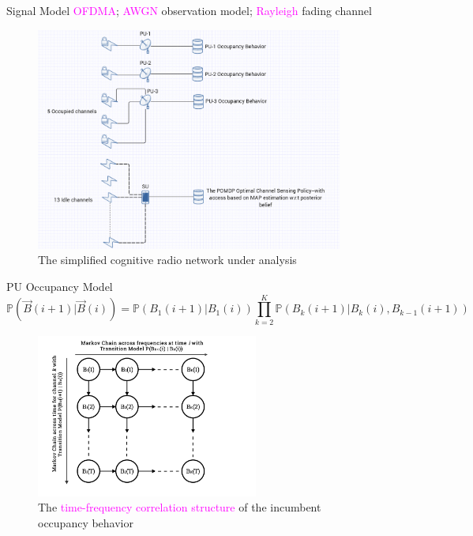 \documentclass{beamer}
\begin{document}
\begin{frame}{Signal Model}
\footnotesize{\textcolor{magenta}{OFDMA}; \textcolor{magenta}{AWGN} observation model; \textcolor{magenta}{Rayleigh} fading channel}
    \begin{figure}
    \centering
    \includegraphics[width = 0.90\textwidth]{POMDP_Network.PNG}
    \caption{The simplified cognitive radio network under analysis}
    \label{fig:24}
\end{figure}
\end{frame}
\begin{frame}{PU Occupancy Model}
\footnotesize{\[\mathbb{P}(\vec{B}(i+1)|\vec{B}(i))=\mathbb{P}(B_{1}(i+1)|B_{1}(i))\prod_{k=2}^{K}\mathbb{P}(B_{k}(i+1)|B_{k}(i), B_{k-1}(i+1))\]}
\begin{figure}
    \centering
    \includegraphics[width = 0.65\textwidth]{MarkovChainsVisualization.png}
    \caption{The \textcolor{magenta}{time-frequency correlation structure} of the incumbent occupancy behavior}
    \label{fig:31}
\end{figure}
\end{frame}
\end{document}
